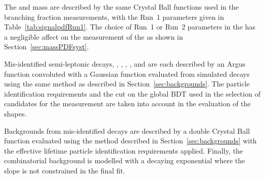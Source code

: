 
The \bsmumu and \bdmumu mass \pdfs are described by the same Crystal Ball functions used in the branching fraction measurements, with the Run~1 parameters given in Table~\ref{tab:signalpdfRun1}. %
The choice of Run~1 or Run~2 parameters in the \pdf has a negligible affect on the measurement of the \bsmumu \el as shown in Section~\ref{sec:massPDFsyst}.

Mis-identified semi-leptonic decays, \lambdab, \bdpimunu, \bsKmunu, \bupimumu, \bdpimumu and \bcjpsimunu are each described by an Argus function convoluted with a Gaussian function evaluated from simulated decays using the same method as described in Section~\ref{sec:backgrounds}. The particle identification requirements and the cut on the global BDT used in the selection of candidates for the \el measurement are taken into account in the evaluation of the \pdf shapes. %

Backgrounds from mis-identified \bhh decays are described by a double Crystal Ball function evaluated using the method described in Section~\ref{sec:backgrounds} with the effective lifetime particle identification requirements applied. Finally, the combinatorial background is modelled with a decaying exponential where the slope is not constrained in the final fit.



